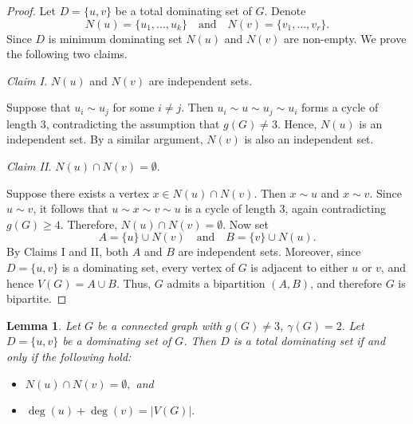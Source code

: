 \documentclass[12pt]{amsart}
\theoremstyle{plain}
\newtheorem{lemma}[theorem]{Lemma}
\theoremstyle{definition}
\begin{document}
\begin{proof}
Let $D=\{u,v\}$ be a total dominating set of $G$. 
Denote
\[
N(u)=\{u_1,\dots,u_k\}
\quad \text{and} \quad
N(v)=\{v_1,\dots,v_r\}.
\]
Since $D$ is minimum dominating set $N(u)$ and $N(v)$ are non-empty.
We prove the following two claims.

\medskip
\noindent
\textit{Claim I.} $N(u)$ and $N(v)$ are independent sets.

Suppose that $u_i\sim u_j$ for some $i\neq j$. Then
$u_i \sim u \sim u_j \sim u_i$ forms a cycle of length $3$, contradicting the assumption that $g(G)\neq 3$. Hence, $N(u)$ is an independent set. By a similar argument, $N(v)$ is also an independent set.

\medskip
\noindent
\textit{Claim II.} $N(u)\cap N(v)=\emptyset$.

Suppose there exists a vertex $x\in N(u)\cap N(v)$. Then $x\sim u$ and $x\sim v$. Since $u\sim v$, it follows that
$u \sim x \sim v \sim u$
is a cycle of length $3$, again contradicting $g(G)\ge 4$. Therefore, $N(u)\cap N(v)=\emptyset$. Now set
\[
A=\{u\}\cup N(v)
\quad \text{and} \quad
B=\{v\}\cup N(u).
\]
By Claims I and II, both $A$ and $B$ are independent sets. Moreover, since $D=\{u,v\}$ is a dominating set, every vertex of $G$ is adjacent to either $u$ or $v$, and hence $V(G)=A\cup B.$ Thus, $G$ admits a bipartition $(A,B)$, and therefore $G$ is bipartite.
\end{proof}

\begin{lemma}\label{Lemma:D-td-iff-deg=V(G)}
Let $G$ be a connected graph with $g(G)\neq 3$, $\gamma(G)=2.$ 
Let $D=\{u,v\}$ be a dominating set of $G$. Then $D$ is a total dominating set if and only if the following hold:
\begin{itemize}
\item $N(u)\cap N(v)=\emptyset,$ and
\item $\deg(u)+\deg(v)=|V(G)|.$
\end{itemize}
\end{lemma}
\end{document}
